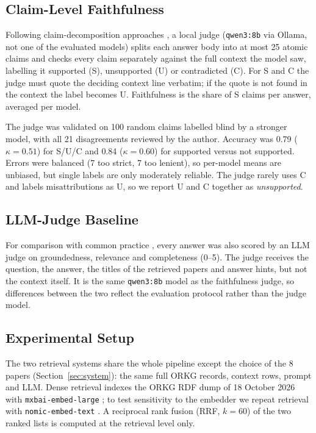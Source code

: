 \subsection{Claim-Level Faithfulness}

Following claim-decomposition approaches \cite{min2023factscore,es2024ragas}, a
local judge (\texttt{qwen3:8b} via Ollama, not one of the evaluated models)
splits each answer body into at most 25 atomic claims and checks every claim
separately against the full context the model saw, labelling it supported (S),
unsupported (U) or contradicted (C). For S and C the judge must quote the
deciding context line verbatim; if the quote is not found in the context the
label becomes U. Faithfulness is the share of S claims per answer, averaged per
model.

The judge was validated on 100 random claims labelled blind by a stronger
model, with all 21 disagreements reviewed by the author. Accuracy was 0.79
($\kappa = 0.51$) for S/U/C and 0.84 ($\kappa = 0.60$) for supported versus not
supported. Errors were balanced (7 too strict, 7 too lenient), so per-model
means are unbiased, but single labels are only moderately reliable. The judge
rarely uses C and labels misattributions as U, so we report U and C together as
\emph{unsupported}.

\subsection{LLM-Judge Baseline}

For comparison with common practice \cite{liu2023geval,zheng2023judging}, every
answer was also scored by an LLM judge on groundedness, relevance and
completeness (0--5). The judge receives the question, the answer, the titles of
the retrieved papers and answer hints, but not the context itself. It is the
same \texttt{qwen3:8b} model as the faithfulness judge, so differences between
the two reflect the evaluation protocol rather than the judge model.

\subsection{Experimental Setup}

The two retrieval systems share the whole pipeline except the choice of the 8
papers (Section~\ref{sec:system}): the same full ORKG records, context rows,
prompt and LLM. Dense retrieval indexes the ORKG RDF dump of 18 October 2026 with
\texttt{mxbai-embed-large} \cite{mxbai2024}; to test sensitivity to the
embedder we repeat retrieval with \texttt{nomic-embed-text} \cite{nussbaum2024nomic}.
A reciprocal rank fusion (RRF, $k = 60$) \cite{cormack2009rrf} of the two ranked lists
is computed at the retrieval level only.

